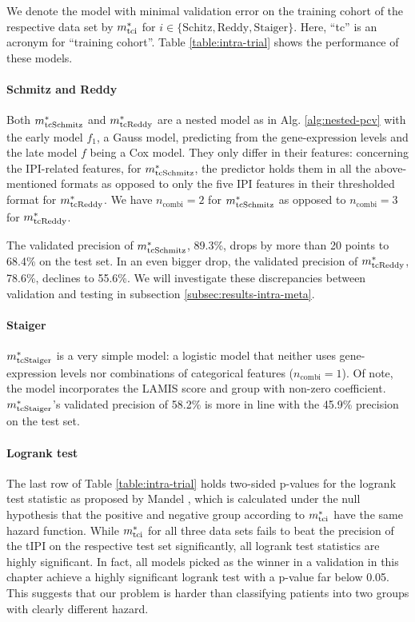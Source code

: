 We denote the model with minimal validation error on the training cohort of the respective data set 
by $m^*_\text{tci}$ for $i \in \{\text{Schitz}, \text{Reddy}, \text{Staiger}\}$.  Here, ``tc'' is an 
acronym for ``training cohort''. Table \ref{table:intra-trial} shows the performance of these models.

\paragraph{Schmitz and Reddy}
Both $m^*_\text{tcSchmitz}$ and $m^*_\text{tcReddy}$ are a nested 
model as in Alg. \ref{alg:nested-pcv} with the early model $f_1$, a Gauss model, predicting from 
the gene-expression levels and the late model $f$ being a Cox model. They only differ in their 
features: concerning the IPI-related features, for $m^*_\text{tcSchmitz}$, the predictor holds them in
all the above-mentioned formats as opposed to only the five IPI features in their thresholded 
format for 
$m^*_\text{tcReddy}$. We have $n_\text{combi} = 2$ for $m^*_\text{tcSchmitz}$ as opposed to $n_\text{combi} = 3$ 
for $m^*_\text{tcReddy}$.

The validated precision of $m^*_\text{tcSchmitz}$, \num{89.3}\%, drops by more than \num{20} points 
to \num{68.4}\% on the test set. In an even bigger drop, the validated precision of $m^*_\text{tcReddy}$,
\num{78.6}\%, declines to \num{55.6}\%. We will investigate these discrepancies between 
validation and testing in subsection \ref{subsec:results-intra-meta}.

\paragraph{Staiger}
$m^*_\text{tcStaiger}$ is a very simple model: a logistic model that neither uses 
gene-expression levels nor combinations of categorical features ($n_\text{combi} = 1$). Of note, the 
model incorporates the LAMIS score and group with non-zero coefficient. $m^*_\text{tcStaiger}$'s 
validated precision of \num{58.2}\% is more in line with the \num{45.9}\% precision on the test set.

\paragraph{Logrank test}
The last row of Table \ref{table:intra-trial} holds two-sided p-values for the logrank test
statistic as proposed by Mandel \cite{mantel66}, which is calculated under the null hypothesis 
that the positive and negative group according to $m^*_\text{tci}$ have the same hazard function. While 
$m^*_\text{tci}$ for all three data sets fails to beat the precision of the tIPI on the respective test 
set significantly, all logrank 
test statistics are highly significant. In fact, all models picked as the winner in a validation in this 
chapter achieve a highly significant logrank test with a p-value far below \num{0.05}. 
This suggests that our problem is harder than classifying patients into two groups with clearly 
different hazard. 

